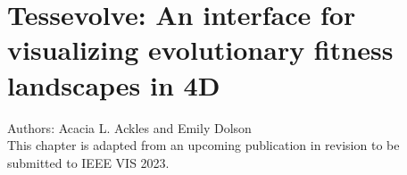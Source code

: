 \chapter{Tessevolve: An interface for visualizing evolutionary fitness landscapes in 4D}
\label{ch:vr-viz}

\noindent Authors: Acacia L. Ackles and Emily Dolson\\
This chapter is adapted from an upcoming publication in revision to be submitted to IEEE VIS 2023.









